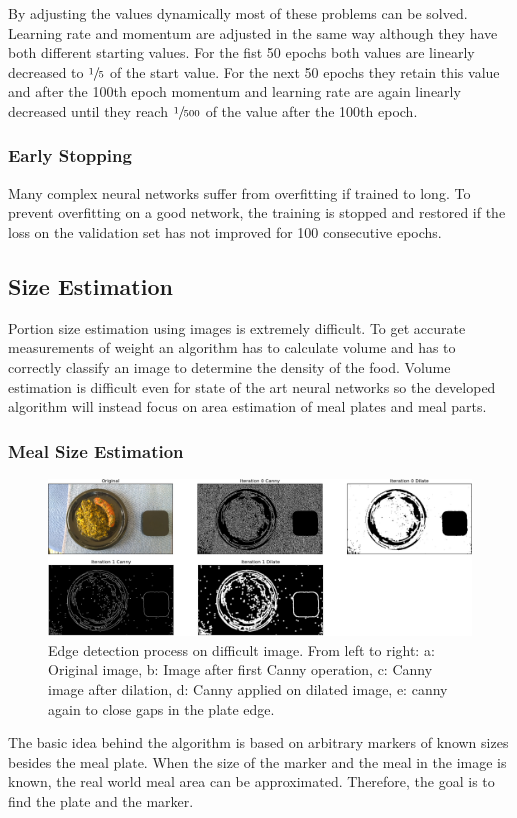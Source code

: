 By adjusting the values dynamically most of these problems can be solved. Learning rate and momentum are adjusted in the same way although they have both different starting values. For the fist 50 epochs both values are linearly decreased to $\sfrac{1}{5}$ of the start value. For the next 50 epochs they retain this value and after the 100th epoch momentum and learning rate are again linearly decreased until they reach $\sfrac{1}{500}$ of the value after the 100th epoch.

\subsubsection*{Early Stopping}
Many complex neural networks suffer from overfitting if trained to long. To prevent overfitting on a good network, the training is stopped and restored if the loss on the validation set has not improved for 100 consecutive epochs.

\subsection{Size Estimation}
Portion size estimation using images is extremely difficult. To get accurate measurements of weight an algorithm has to calculate volume and has to correctly classify an image to determine the density of the food. Volume estimation is difficult even for state of the art neural networks \cite{Meyers2015} so the developed algorithm will instead focus on area estimation of meal plates and meal parts.

\subsubsection*{Meal Size Estimation}
\begin{figure}
	\centering
	\includegraphics[width=\linewidth]{figures/setup_edgeDetection}		
	\caption{Edge detection process on difficult image. From left to right: a: Original image, b: Image after first Canny operation, c: Canny image after dilation, d: Canny applied on dilated image, e: canny again to close gaps in the plate edge.}
	\label{fig:edgeDetection}
\end{figure}
The basic idea behind the algorithm is based on arbitrary markers of known sizes besides the meal plate. When the size of the marker and the meal in the image is known, the real world meal area can be approximated. Therefore, the goal is to find the plate and the marker.

